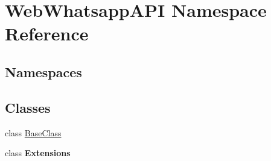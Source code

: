 \hypertarget{namespace_web_whatsapp_a_p_i}{}\section{Web\+Whatsapp\+A\+PI Namespace Reference}
\label{namespace_web_whatsapp_a_p_i}
\subsection*{Namespaces}
\begin{DoxyCompactItemize}
\end{DoxyCompactItemize}
\subsection*{Classes}
\begin{DoxyCompactItemize}
\item 
class \hyperlink{class_web_whatsapp_a_p_i_1_1_base_class}{Base\+Class}
\item 
class {\bfseries Extensions}
\end{DoxyCompactItemize}
